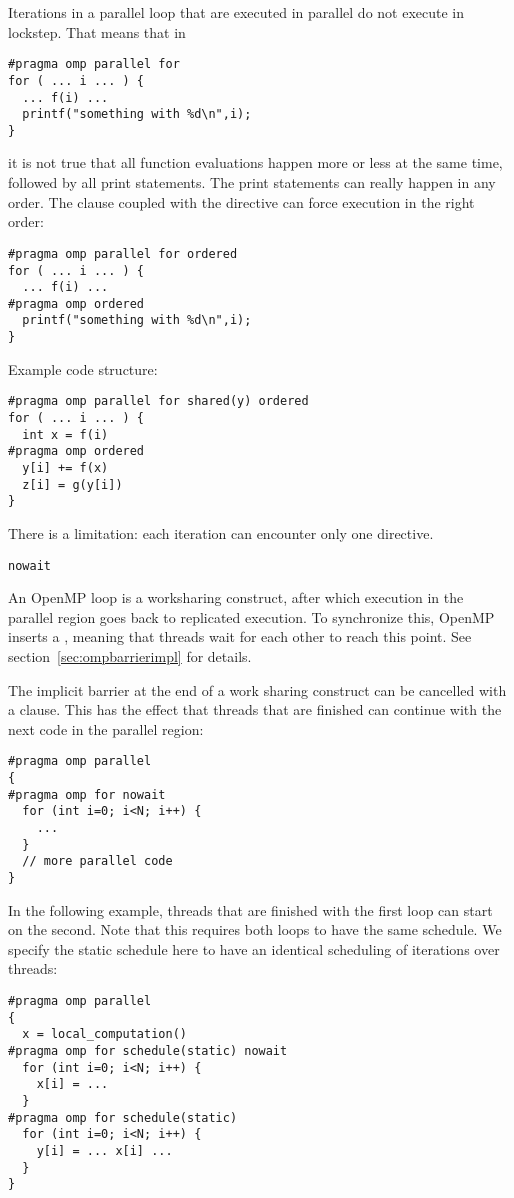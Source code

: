 Iterations in a parallel loop that are executed in parallel do not
execute in lockstep. That means that in
\begin{lstlisting}
#pragma omp parallel for
for ( ... i ... ) {
  ... f(i) ...
  printf("something with %d\n",i);
}
\end{lstlisting}
it is not true that all function evaluations happen more or less at
the same time, followed by all print statements. The print statements
can really happen in any order. The  clause
coupled with the  directive can
force execution in the right order:
\begin{lstlisting}
#pragma omp parallel for ordered
for ( ... i ... ) {
  ... f(i) ...
#pragma omp ordered
  printf("something with %d\n",i);
}
\end{lstlisting}
Example code structure:
\begin{lstlisting}
#pragma omp parallel for shared(y) ordered
for ( ... i ... ) {
  int x = f(i)
#pragma omp ordered
  y[i] += f(x)
  z[i] = g(y[i])
}
\end{lstlisting}
There is a limitation:
each iteration can encounter only one  directive.

 {\texttt{nowait}}
\label{sec:omp-nowait}

An OpenMP loop is a worksharing construct,
after which execution in the parallel region goes back
to replicated execution.
To synchronize this, OpenMP inserts a ,
meaning that threads wait for each other to reach this point.
See section~\ref{sec:ompbarrierimpl} for details.

The implicit barrier at the end of a work sharing construct
can be cancelled with a
 clause.
This has the effect that threads that are finished can continue
with the next code in the parallel region:
\begin{lstlisting}
#pragma omp parallel
{
#pragma omp for nowait
  for (int i=0; i<N; i++) {
    ...
  }
  // more parallel code
}
\end{lstlisting}

In the following example, threads that are finished with the first loop
can start on the second. Note that this requires both loops to have
the same schedule. We specify the static schedule here to have an
identical scheduling of iterations over threads:
\begin{lstlisting}
#pragma omp parallel
{
  x = local_computation()
#pragma omp for schedule(static) nowait
  for (int i=0; i<N; i++) { 
    x[i] = ... 
  }
#pragma omp for schedule(static)
  for (int i=0; i<N; i++) { 
    y[i] = ... x[i] ...
  }
}
\end{lstlisting}

